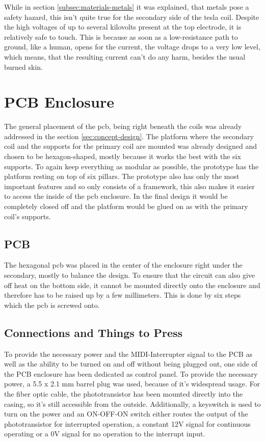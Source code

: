 While in section \ref{subsec:materials-metals} it was explained, that metals pose a safety hazard, this isn't quite true for the secondary side of the tesla coil. Despite the high voltages of up to several kilovolts present at the top electrode, it is relatively safe to touch. This is because as soon as a low-resistance path to ground, like a human, opens for the current, the voltage drops to a very low level, which means, that the resulting current can't do any harm, besides the usual burned skin.

\section{PCB Enclosure}

The general placement of the \gls{pcb}, being right beneath the coils was already addressed in the section \ref{sec:concept-design}. The platform where the secondary coil and the supports for the primary coil are mounted was already designed and chosen to be hexagon-shaped, mostly because it works the best with the six supports. To again keep everything as modular as possible, the prototype has the platform resting on top of six pillars. The prototype also has only the most important features and so only consists of a framework, this also makes it easier to access the inside of the \gls{pcb} enclosure. In the final design it would be completely closed off and the platform would be glued on as with the primary coil's supports.

\subsection{PCB}

The hexagonal \gls{pcb} was placed in the center of the enclosure right under the secondary, mostly to balance the design. To ensure that the circuit can also give off heat on the bottom side, it cannot be mounted directly onto the enclosure and therefore has to be raised up by a few millimeters. This is done by six steps which the \gls{pcb} is screwed onto. 

\subsection{Connections and Things to Press}

To provide the necessary power and the MIDI-Interrupter signal to the PCB as well as the ability to be turned on and off without being plugged out, one side of the PCB enclosure has been dedicated as control panel. To provide the necessary power, a 5.5 x 2.1 mm barrel plug was used, because of it's widespread usage. For the fiber optic cable, the phototransistor has been mounted directly into the casing, so it's still accessible from the outside. Additionally, a keyswitch is used to turn on the power and an ON-OFF-ON switch either routes the output of the phototransistor for interrupted operation, a constant 12V signal for continuous operating or a 0V signal for no operation to the interrupt input.
